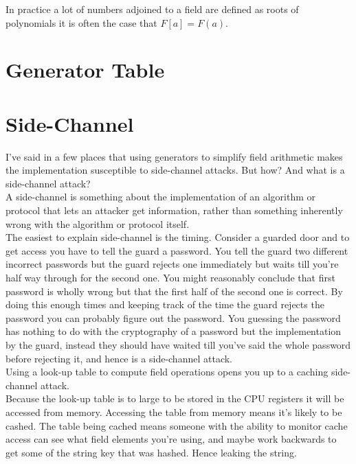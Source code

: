 In practice a lot of numbers adjoined to a field are defined as roots of polynomials it is often the case that $F[a] = F(a)$.


\section{Generator Table}
\section{Side-Channel}
\label{appx:side-channel}
I've said in a few places that using generators to simplify field arithmetic makes the implementation susceptible to side-channel attacks.
But how?
And what is a side-channel attack?
\\

A side-channel is something about the implementation of an algorithm or protocol that lets an attacker get information,
rather than something inherently wrong with the algorithm or protocol itself. 
\\

The easiest to explain side-channel is the timing.
Consider a guarded door and to get access you have to tell the guard a password.
You tell the guard two different incorrect passwords but the guard rejects one immediately but waits till you're half way through for the second one.
You might reasonably conclude that first password is wholly wrong but that the first half of the second one is correct.
By doing this enough times and keeping track of the time the guard rejects the password you can probably figure out the password.
You guessing the password has nothing to do with the cryptography of a password but the implementation by the guard,
instead they should have waited till you've said the whole password before rejecting it, 
and hence is a side-channel attack.
\\

Using a look-up table to compute field operations opens you up to a caching side-channel attack.
\\

Because the look-up table is to large to be stored in the CPU registers it will be accessed from memory.
Accessing the table from memory means it's likely to be cashed.
The table being cached means someone with the ability to monitor cache access can see what field elements you're using,
and maybe work backwards to get some of the string key that was hashed.
Hence leaking the string.
\\


